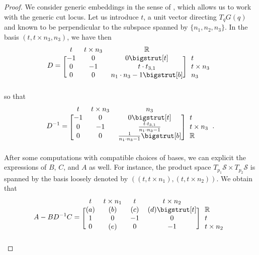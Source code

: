 \documentclass[11pt]{article}
\newcommand{\R}{\mathbb{R}}
\newcommand{\Surf}{\mathcal{S}}
\newcommand\topstrut[1][1.2ex]{\setlength\bigstrutjot{#1}{\bigstrut[t]}}
\newcommand\botstrut[1][1.2ex]{\setlength\bigstrutjot{#1}{\bigstrut[b]}}
\theoremstyle{plain}
\theoremstyle{definition}
\theoremstyle{remark}
\begin{document}
\begin{proof}
		We consider generic embeddings in the sense of , which allows us to work with the generic cut locus.
		Let us introduce $t$, a unit vector directing $T_q G(q)$ and known to be perpendicular to the subspace spanned by $\{n_1,n_2,n_3\}$.
		In the basis $(t,t \times n_3, n_3)$, we have then
		\[
		D = 
		\begin{blockarray}{cccl}
			\begin{block}{cccl}
				t & t \times n_3 & \R & \\
			\end{block}
			\begin{block}{[ccc] l}
				-1 & 0 & 0 \topstrut & t \\
				0 & -1 & t \cdot t_{3,1} & t \times n_3 \\
				0 & 0 & n_1 \cdot n_3 - 1 \botstrut & n_3 \\
			\end{block}
		\end{blockarray}
		\]
		so that
		\[
		D^{-1} = 
		\begin{blockarray}{cccl}
			\begin{block}{cccl}
				t & t \times n_3 & n_3 & \\
			\end{block}
			\begin{block}{[ccc] l}
				-1 & 0 & 0 \topstrut & t \\
				0 & -1 & \frac{t \cdot t_{3,1}}{n_1 \cdot n_3 - 1} & t \times n_3 \\
				0 & 0 & \frac{1}{n_1 \cdot n_3 - 1} \botstrut & \R \\
			\end{block}
		\end{blockarray}.
		\]
		After some computations with compatible choices of bases, we can explicit the expressions of $B$, $C$, and $A$ as well. For instance, the product space $T_{p_1} \Surf \times T_{p_2} \Surf$ is spanned by the basis loosely denoted by $((t, t\times n_1), (t, t \times n_2))$. We obtain that
		\[A - B D^{-1} C =
		\begin{blockarray}{ccccl}
			\begin{block}{ccccl}
				t & t \times n_1 & t & t \times n_2 & \\
			\end{block}
			\begin{block}{[cccc] l}
				(a) & (b) & (c) & (d) \topstrut & \R \\
				1 & 0 & -1 & 0 & t \\
				0 & (e) & 0 & -1 & t \times n_2 \\

\end{block}
\end{blockarray}\]
\end{proof}
\end{document}
